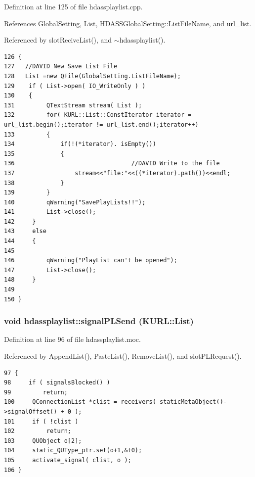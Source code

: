 Definition at line 125 of file hdassplaylist.cpp.

References Global\-Setting, List, HDASSGlobal\-Setting::List\-File\-Name, and url\_\-list.

Referenced by slot\-Recive\-List(), and $\sim$hdassplaylist().



\footnotesize\begin{verbatim}126 {
127   //DAVID New Save List File
128   List =new QFile(GlobalSetting.ListFileName);
129    if ( List->open( IO_WriteOnly ) ) 
130    {
131         QTextStream stream( List );
132         for( KURL::List::ConstIterator iterator = url_list.begin();iterator != url_list.end();iterator++)
133         {       
134             if(!(*iterator). isEmpty())
135             {
136                                 //DAVID Write to the file
137                 stream<<"file:"<<((*iterator).path())<<endl;
138             }   
139         }   
140         qWarning("SavePlayLists!!");
141         List->close();
142     }
143     else
144     {
145         
146         qWarning("PlayList can't be opened");
147         List->close();
148     }
149   
150 }
\end{verbatim}\normalsize 
{}
\subsubsection{\setlength{\rightskip}{0pt plus 5cm}void hdassplaylist::signal\-PLSend (KURL::List)\hspace{0.3cm}{\tt  [signal]}}\label{classhdassplaylist_hdassplaylistl0}




Definition at line 96 of file hdassplaylist.moc.

Referenced by Append\-List(), Paste\-List(), Remove\-List(), and slot\-PLRequest().



\footnotesize\begin{verbatim}97 {
98     if ( signalsBlocked() )
99         return;
100     QConnectionList *clist = receivers( staticMetaObject()->signalOffset() + 0 );
101     if ( !clist )
102         return;
103     QUObject o[2];
104     static_QUType_ptr.set(o+1,&t0);
105     activate_signal( clist, o );
106 }
\end{verbatim}\normalsize 
{}
